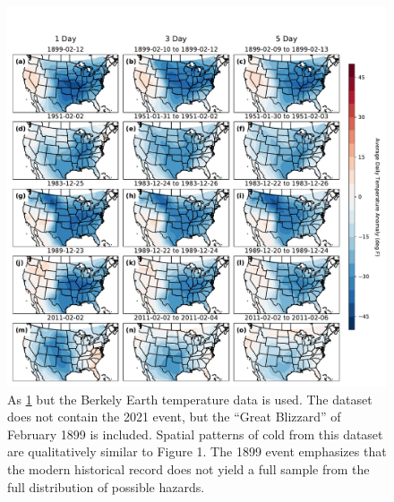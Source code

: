 \documentclass[12pt]{iopart}
\begin{document}
\begin{figure}
  \centering
  \includegraphics[width=\textwidth]{historic_events_bk.pdf}
  \caption{
    As \cref{fig:historic_bk} but the Berkely Earth temperature data is used.
    The dataset does not contain the 2021 event, but the ``Great Blizzard'' of February 1899 is included.
    Spatial patterns of cold from this dataset are qualitatively similar to Figure 1.
    The 1899 event emphasizes that the modern historical record does not yield a full sample from the full distribution of possible hazards.
  }\label{fig:historic_bk}
\end{figure}
\end{document}
